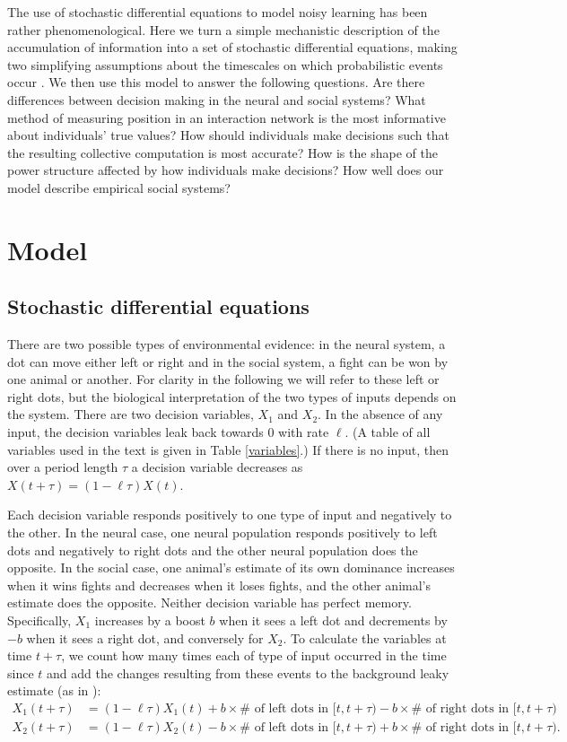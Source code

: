 \documentclass{article}
\begin{document}
The use of stochastic differential equations to model noisy learning has been rather phenomenological.  Here we turn a simple mechanistic description of the accumulation of information into a set of stochastic differential equations, making two simplifying assumptions about the timescales on which probabilistic events occur \cite{Gillespie:2000fk}. We then use this model to answer the following questions. Are there differences between decision making in the neural and social systems? What method of measuring position in an interaction network is the most informative about individuals' true values? How should individuals make decisions such that the resulting collective computation is most accurate? How is the shape of the power structure affected by how individuals make decisions? How well does our model describe empirical social systems?

\section{Model} 
\subsection{Stochastic differential equations }    

There are two possible types of environmental evidence: in the neural system, a dot can move either left or right and in the social system, a fight can be won by one animal or another.  For clarity in the following we will refer to these left or right dots, but the biological interpretation of the two types of inputs depends on the system. There are two decision variables, $X_1$ and $X_2$. In the absence of any input, the decision variables leak back towards $0$ with rate $\ell$.  (A table of all variables used in the text is given in Table \ref{variables}.)  If there is no input, then over a period length $\tau$ a decision variable decreases as $X(t+\tau)=(1-\ell\tau)X(t)$.

Each decision variable responds positively to one type of input and negatively to the other.  In the neural case, one neural population responds positively to left dots and negatively to right dots and the other neural population does the opposite.  In the social case, one animal's estimate of its own dominance increases when it wins fights and decreases when it loses fights, and the other animal's estimate does the opposite. Neither decision variable has perfect memory.  Specifically, $X_1$ increases by a boost $b$ when it sees a left dot and decrements by $-b$ when it sees a right dot, and conversely for $X_2$.     
To calculate the variables at time $t+\tau$, we  count how many times each of type of input occurred in the time since $t$ and add the changes resulting from these events to the background leaky estimate (as in \cite{Gillespie:2000fk}):
\begin{align*}
X_1(t+\tau)&=(1-\ell\tau)X_1(t)+b\times\# \text{ of left dots in }[t,t+\tau)-b\times\# \text{ of right dots in }[t,t+\tau)
\\ X_2(t+\tau)&=(1-\ell\tau)X_2(t)-b\times\# \text{ of left dots in }[t,t+\tau)+b\times\# \text{ of right dots in }[t,t+\tau). 
\end{align*}
\end{document}
